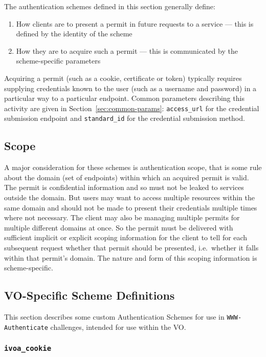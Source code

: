 \documentclass[11pt,a4paper]{ivoa}
\newcommand{\header}[1]{{\tt #1}}
\begin{document}
The authentication schemes defined in this section
generally define:
\begin{enumerate}
  \item How clients are to present a permit in future requests
        to a service --- this is defined by the identity of the scheme
  \item How they are to acquire such a permit ---
        this is communicated by the scheme-specific parameters
\end{enumerate}
Acquiring a permit (such as a cookie, certificate or token)
typically requires supplying credentials known to the user
(such as a username and password) in a particular way to a particular
endpoint.
Common parameters describing this activity are given in
Section~\ref{sec:common-params}:
\verb|access_url| for the credential submission endpoint and
\verb|standard_id| for the credential submission method.


\subsection{Scope}\label{sec:scope}

A major consideration for these schemes is authentication scope,
that is some rule about the domain (set of endpoints) within which an
acquired permit is valid.
The permit is confidential information and so must not be leaked to services
outside the domain.
But users may want to access multiple resources within the same domain
and should not be made to present their credentials
multiple times where not necessary.
The client may also be managing multiple permits
for multiple different domains at once.
So the permit must be delivered with sufficient
implicit or explicit scoping
information for the client to tell for each subsequent request
whether that permit should be presented,
i.e.\ whether it falls within that permit's domain.
The nature and form of this scoping information is scheme-specific.



\subsection{VO-Specific Scheme Definitions}\label{sec:voschemes}

This section describes some custom Authentication Schemes
for use in \header{WWW-Authenticate} challenges,
intended for use within the VO.

\subsubsection{\mbox{\tt ivoa\_cookie}}\label{sec:ivoa-cookie}
\end{document}
